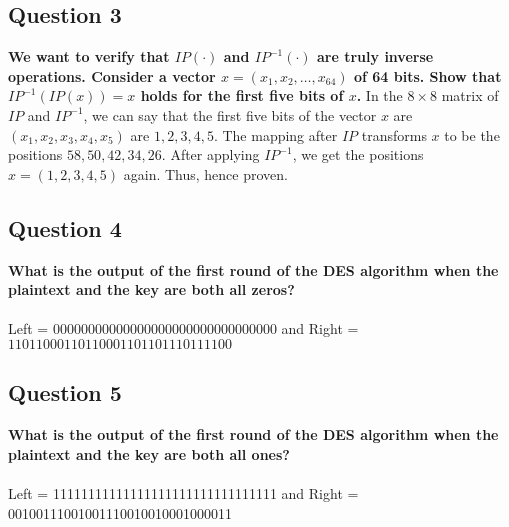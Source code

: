 \documentclass[titlepage]{article}
\begin{document}
{\subsection{Question 3}
{
\textbf{We want to verify that \(IP(\cdot)\) and \(IP^{-1}(\cdot)\) are truly inverse operations. Consider a vector \(x = (x_1, x_2, \dots, x_{64})\) of 64 bits. Show that \(IP^{-1}(IP(x)) = x\) holds for the first five bits of \(x\).}
In the \(8 \times 8\) matrix of \(IP\) and \(IP^{-1}\), we can say that the first five bits of the vector \(x\) are \((x_1, x_2, x_3, x_4, x_5)\) are \(1, 2, 3, 4, 5\). The mapping after \(IP\) transforms \(x\) to be the positions \(58, 50, 42, 34, 26\). After applying \(IP^{-1}\), we get the positions \(x = (1, 2, 3, 4, 5)\) again. Thus, hence proven.
}
\subsection{Question 4}
{
\textbf{What is the output of the first round of the DES algorithm when the plaintext
and the key are both all zeros?}\\\\
Left = \(00000000000000000000000000000000\) and Right = \(11011000110110001101101110111100\)
}
\subsection{Question 5}
{
\textbf{What is the output of the first round of the DES algorithm when the plaintext and the key are both all ones?}\\\\
Left = 11111111111111111111111111111111 and Right = 00100111001001110010010001000011
}
}
\end{document}
